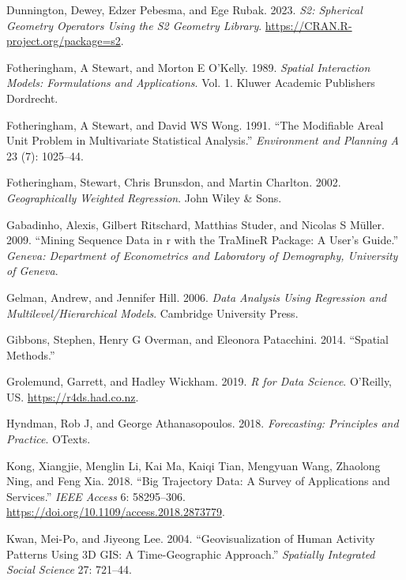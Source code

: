\documentclass[
  letterpaper,
  DIV=11,
  numbers=noendperiod,
  oneside]{scrreprt}
\newlength{\cslhangindent}
\newenvironment{CSLReferences}[2] %
 {\begin{list}{}{%
  \setlength{\itemindent}{0pt}
  \setlength{\leftmargin}{0pt}
  \setlength{\parsep}{0pt}
  \ifodd #1
   \setlength{\leftmargin}{\cslhangindent}
   \setlength{\itemindent}{-1\cslhangindent}
  \fi
  \setlength{\itemsep}{#2\baselineskip}}}
 {\end{list}}
\begin{document}
\begin{CSLReferences}{1}{0}
Dunnington, Dewey, Edzer Pebesma, and Ege Rubak. 2023. \emph{S2:
Spherical Geometry Operators Using the S2 Geometry Library}.
\url{https://CRAN.R-project.org/package=s2}.

Fotheringham, A Stewart, and Morton E O'Kelly. 1989. \emph{Spatial
Interaction Models: Formulations and Applications}. Vol. 1. Kluwer
Academic Publishers Dordrecht.

Fotheringham, A Stewart, and David WS Wong. 1991. {``The Modifiable
Areal Unit Problem in Multivariate Statistical Analysis.''}
\emph{Environment and Planning A} 23 (7): 1025--44.

Fotheringham, Stewart, Chris Brunsdon, and Martin Charlton. 2002.
\emph{Geographically Weighted Regression}. John Wiley \& Sons.

Gabadinho, Alexis, Gilbert Ritschard, Matthias Studer, and Nicolas S
Müller. 2009. {``Mining Sequence Data in r with the TraMineR Package: A
User's Guide.''} \emph{Geneva: Department of Econometrics and Laboratory
of Demography, University of Geneva}.

Gelman, Andrew, and Jennifer Hill. 2006. \emph{Data Analysis Using
Regression and Multilevel/Hierarchical Models}. Cambridge University
Press.

Gibbons, Stephen, Henry G Overman, and Eleonora Patacchini. 2014.
{``Spatial Methods.''}

Grolemund, Garrett, and Hadley Wickham. 2019. \emph{R for Data Science}.
O'Reilly, US. \url{https://r4ds.had.co.nz}.

Hyndman, Rob J, and George Athanasopoulos. 2018. \emph{Forecasting:
Principles and Practice}. OTexts.

Kong, Xiangjie, Menglin Li, Kai Ma, Kaiqi Tian, Mengyuan Wang, Zhaolong
Ning, and Feng Xia. 2018. {``Big Trajectory Data: A Survey of
Applications and Services.''} \emph{IEEE Access} 6: 58295--306.
\url{https://doi.org/10.1109/access.2018.2873779}.

Kwan, Mei-Po, and Jiyeong Lee. 2004. {``Geovisualization of Human
Activity Patterns Using 3D GIS: A Time-Geographic Approach.''}
\emph{Spatially Integrated Social Science} 27: 721--44.


\end{CSLReferences}
\end{document}
